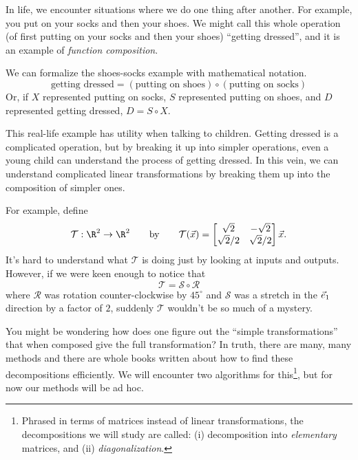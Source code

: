 
In life, we encounter situations where we do one thing after another. For example, you
put on your socks and then your shoes. We might call this whole operation (of first putting on your socks
and then your shoes) ``getting dressed'', and it is an example of \emph{function composition}. 


We can formalize the shoes-socks example 
with mathematical notation.
\[
	\text{getting dressed} = (\text{putting on shoes})\circ (\text{putting on socks})
\]
Or, if $X$ represented putting on socks, $S$ represented putting on shoes, and $D$ represented getting dressed,
$D=S\circ X$.

This real-life example has utility when talking to children. Getting dressed is a complicated operation, but by breaking
it up into simpler operations, even a young child can understand the process of getting dressed. In this vein, we can understand
complicated linear transformations by breaking them up into the composition of simpler ones.

For example, define
\[
	\mathcal T:\R^2\to\R^2\qquad\text{by}\qquad \mathcal T(\vec x)=\matc{\sqrt{2}&-\sqrt{2}\\{\sqrt{2}}/{2} & {\sqrt{2}}/{2}}\vec x.
\]
It's hard to understand what $\mathcal T$ is doing just by looking at inputs and outputs. However, if we were keen enough to notice that
\[
	\mathcal T=\mathcal S\circ \mathcal R
\]
where $\mathcal R$ was rotation counter-clockwise by $45^\circ$ and $\mathcal S$ was a stretch in the ${\vec e_1}$ direction by a factor of $2$,
suddenly $\mathcal T$ wouldn't be so much of a mystery.

You might be wondering how does one figure out the ``simple transformations'' that when composed give the full transformation?
In truth, there are many, many methods and there are whole books written about how to find these decompositions efficiently.
We will encounter two algorithms for this\footnote{ Phrased in terms of matrices instead of linear transformations, the decompositions we
will study are called: (i) decomposition into \emph{elementary} matrices, and (ii) \emph{diagonalization}.}, but for now
our methods will be ad hoc.

